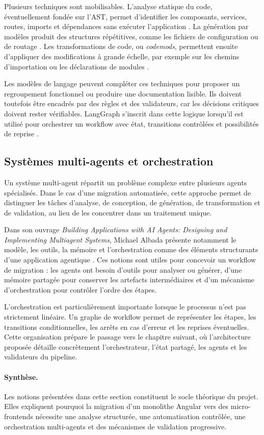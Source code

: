 Plusieurs techniques sont mobilisables. L'analyse statique du code, éventuellement fondée sur l'AST, permet d'identifier les composants, services, routes, imports et dépendances sans exécuter l'application \cite{typescript_compiler_api,ts_morph}. La génération par modèles produit des structures répétitives, comme les fichiers de configuration ou de routage \cite{angular_schematics,nx_generators}. Les transformations de code, ou \textit{codemods}, permettent ensuite d'appliquer des modifications à grande échelle, par exemple sur les chemins d'importation ou les déclarations de modules \cite{jscodeshift,openrewrite}.

Les modèles de langage peuvent compléter ces techniques pour proposer un regroupement fonctionnel ou produire une documentation lisible. Ils doivent toutefois être encadrés par des règles et des validateurs, car les décisions critiques doivent rester vérifiables. LangGraph s'inscrit dans cette logique lorsqu'il est utilisé pour orchestrer un workflow avec état, transitions contrôlées et possibilités de reprise \cite{langgraph_docs,langgraph_durable_execution}.

\subsection{Systèmes multi-agents et orchestration}

Un système multi-agent répartit un problème complexe entre plusieurs agents spécialisés. Dans le cas d'une migration automatisée, cette approche permet de distinguer les tâches d'analyse, de conception, de génération, de transformation et de validation, au lieu de les concentrer dans un traitement unique.

Dans son ouvrage \textit{Building Applications with AI Agents: Designing and Implementing Multiagent Systems}, Michael Albada présente notamment le modèle, les outils, la mémoire et l'orchestration comme des éléments structurants d'une application agentique \cite{albada_agents}. Ces notions sont utiles pour concevoir un workflow de migration : les agents ont besoin d'outils pour analyser ou générer, d'une mémoire partagée pour conserver les artefacts intermédiaires et d'un mécanisme d'orchestration pour contrôler l'ordre des étapes.

L'orchestration est particulièrement importante lorsque le processus n'est pas strictement linéaire. Un graphe de workflow permet de représenter les étapes, les transitions conditionnelles, les arrêts en cas d'erreur et les reprises éventuelles. Cette organisation prépare le passage vers le chapitre suivant, où l'architecture proposée détaille concrètement l'orchestrateur, l'état partagé, les agents et les validateurs du pipeline.

\paragraph{Synthèse.}
Les notions présentées dans cette section constituent le socle théorique du projet. Elles expliquent pourquoi la migration d'un monolithe Angular vers des micro-frontends nécessite une analyse structurée, une automatisation contrôlée, une orchestration multi-agents et des mécanismes de validation progressive.
